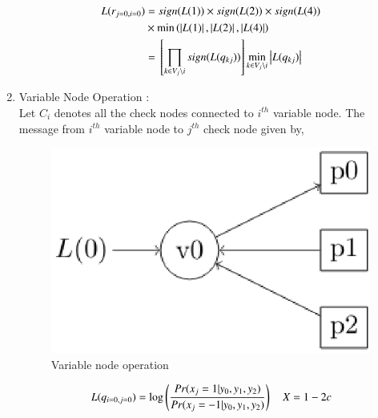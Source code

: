 \documentclass[journal,12pt,twocolumn]{IEEEtran}
\begin{document}
\begin{enumerate}
\begin{align}
L(r_{j=0,i=0}) &= sign(L(1))\times sign(L(2))\times sign(L(4))\\ \nonumber
&\times \min \left(\left\vert L(1)\right\vert,\left\vert L(2)\right\vert,\left\vert L(4)\right\vert\right) \\\nonumber
&={}\left[\prod_{k \in V_j \setminus i} sign(L(q_{kj}))\right] \min_{k \in V_j \setminus i} \left\vert L(q_{kj})\right\vert\\ \label{eq : rji}
\end{align}
%
\item Variable Node Operation :\\
Let ${C_i}$ denotes all the check nodes connected to $i^{th}$ variable node. The message from $i^{th}$ variable node to  $j^{th}$ check node given by,
\begin{figure}[!ht]
\begin{center}
%
%    
%
%    
%
%
%
%
%
%
%
\includegraphics[width=\columnwidth]{./figs/varope}
\end{center}
\caption{Variable node operation}
\label{fig : var}
\end{figure}
\begin{align}
L(q_{i=0,j=0})&=\log \brak{\frac{Pr(x_j=1|y_0,y_1,y_2)}{Pr(x_j=-1|y_0,y_1,y_2)}} \quad X=1-2c\\

\end{align}
\end{enumerate}
\end{document}
